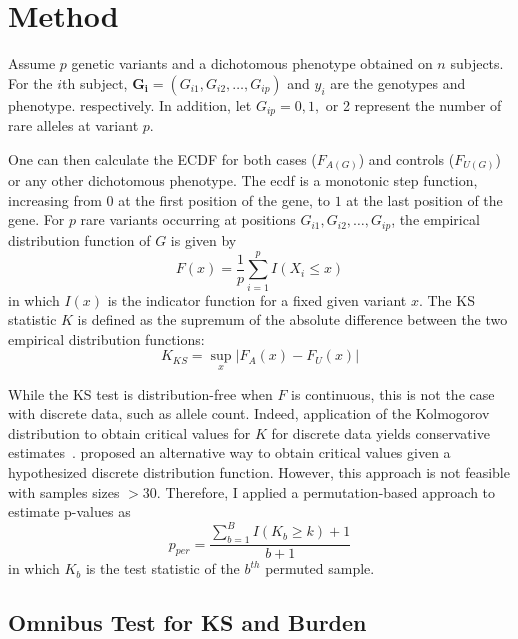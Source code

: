 \section{Method}
\label{sec:method_ksburden}

Assume $p$ genetic variants and a dichotomous phenotype obtained on $n$ subjects.
For the $i$th subject,   $\bm{G_i} = (G_{i1}, G_{i2},\ldots , G_{ip})$ and $y_i$ are the genotypes and phenotype. respectively.
In addition, let $G_{ip} = 0, 1,$ or 2 represent the number of rare alleles at variant $p$.  

One can then calculate the \acrfull{ECDF} for both cases ($F_{A(G)}$) and controls ($F_{U(G)}$) or any other dichotomous phenotype.
The ecdf is a monotonic step function, increasing from $0$ at the first position of the gene, to $1$ at the last position of the gene.
For $p$ rare variants occurring at positions  $G_{i1}, G_{i2}, \ldots, G_{ip}$, the empirical distribution function of $G$ is given by
\begin{equation}
  F(x) = \frac{1}{p}\sum^p_{i=1}I(X_i \leq x)
\end{equation}
in which $I(x)$ is the indicator function for a fixed given variant $x$.
The KS statistic $K$ is defined as the supremum of the absolute difference between the two empirical distribution functions:
\begin{equation}
	K_{KS} = \sup_x | F_A(x) - F_U(x) |
\end{equation}

While the KS test is distribution-free when $F$ is continuous, this is not the case with discrete data, such as allele count.
Indeed, application of the Kolmogorov distribution to obtain critical values for $K$ for discrete data yields conservative estimates~\cite{Walsh1963,Conover1972}. 
\citet{Conover1972} proposed an alternative way to obtain critical values given a hypothesized discrete distribution function.
However, this approach is not feasible with samples sizes $>30$.
Therefore, I applied a permutation-based approach to estimate p-values as 
\begin{equation}
  p_{per} = \frac{\sum^B_{b=1} I(K_b \geq k)+1}{b+1}
\end{equation}
in which $K_b$ is the test statistic of the $b^{th}$ permuted sample.

\subsection{Omnibus Test for KS and Burden}
\label{sub:omnibus_test_for_ks_and_burden}

